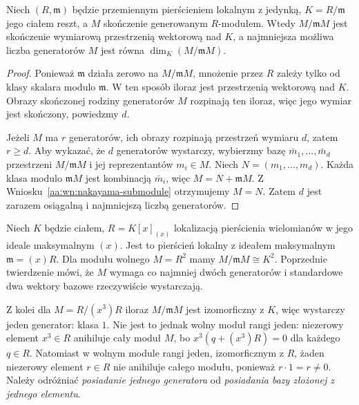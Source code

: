\begin{twierdzenie}
\label{aa:tw:nakayama-minimal-generators}
Niech $(R,\mathfrak m)$ będzie przemiennym pierścieniem
lokalnym z jedynką, $K=R/\mathfrak m$ jego ciałem
reszt, a $M$ skończenie generowanym $R$-modułem.
Wtedy $M/\mathfrak m M$ jest skończenie wymiarową
przestrzenią wektorową nad $K$, a najmniejsza możliwa
liczba generatorów $M$ jest równa
$\dim_K(M/\mathfrak m M)$.
\end{twierdzenie}
\begin{proof}
Ponieważ $\mathfrak m$ działa zerowo na
$M/\mathfrak m M$, mnożenie przez $R$ zależy tylko
od klasy skalara modulo $\mathfrak m$.
W ten sposób iloraz jest przestrzenią wektorową nad $K$.
Obrazy skończonej rodziny generatorów $M$ rozpinają
ten iloraz, więc jego wymiar jest skończony, powiedzmy $d$.

Jeżeli $M$ ma $r$ generatorów, ich obrazy rozpinają
przestrzeń wymiaru $d$, zatem $r\ge d$.
Aby wykazać, że $d$ generatorów wystarczy,
wybierzmy bazę $\bar m_1,\ldots,\bar m_d$
przestrzeni $M/\mathfrak m M$ i jej reprezentantów
$m_i\in M$. Niech $N=(m_1,\ldots,m_d)$.
Każda klasa modulo $\mathfrak m M$ jest kombinacją
$\bar m_i$, więc $M=N+\mathfrak m M$.
Z Wniosku~\ref{aa:wn:nakayama-submodule} otrzymujemy
$M=N$. Zatem $d$ jest zarazem osiągalną i najmniejszą
liczbą generatorów.
\end{proof}

\begin{przyklad}
\label{aa:prz:nakayama-example}
Niech $K$ będzie ciałem,
$R=K[x]_{(x)}$ lokalizacją pierścienia wielomianów
w jego ideale maksymalnym $(x)$. Jest to pierścień
lokalny z ideałem maksymalnym $\mathfrak m=(x)R$.
Dla modułu wolnego $M=R^2$ mamy
$M/\mathfrak m M\cong K^2$.
Poprzednie twierdzenie mówi, że $M$ wymaga
co najmniej dwóch generatorów i standardowe dwa
wektory bazowe rzeczywiście wystarczają.

Z kolei dla $M=R/(x^3)R$ iloraz
$M/\mathfrak m M$ jest izomorficzny z $K$,
więc wystarczy jeden generator: klasa $1$.
Nie jest to jednak wolny moduł rangi jeden:
niezerowy element $x^3\in R$ anihiluje cały moduł
$M$, bo $x^3(q+(x^3)R)=0$ dla każdego $q\in R$.
Natomiast w wolnym module rangi jeden, izomorficznym
z $R$, żaden niezerowy element $r\in R$ nie anihiluje
całego modułu, ponieważ $r\cdot1=r\ne0$.
Należy odróżniać \emph{posiadanie
jednego generatora} od \emph{posiadania bazy złożonej
z jednego elementu}.
\end{przyklad}


